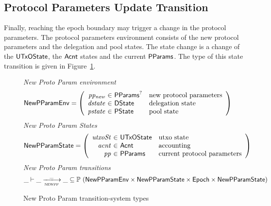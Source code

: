 \clearpage

\subsection{Protocol Parameters Update Transition}
\label{sec:pparam-update}

Finally, reaching the epoch boundary may trigger a change in the protocol
parameters. The protocol parameters environment consists of the new
protocol parameters and the delegation and pool states.
The state change is a change of the $\mathsf{UTxOState}$, the $\mathsf{Acnt}$ states and the current $\mathsf{PParams}$.
The type of this state transition is given in Figure~\ref{fig:ts-types:new-proto-param}.

\begin{figure}[htb]
  \emph{New Proto Param environment}
  \begin{equation*}
    \NewPParamEnv =
    \left(
      \begin{array}{r@{~\in~}ll}
        \var{pp_{new}} & \PParams^? & \text{new protocol parameters}\\
        \var{dstate} & \DState & \text{delegation state}\\
        \var{pstate} & \PState & \text{pool state}\\
      \end{array}
    \right)
  \end{equation*}
  \emph{New Proto Param States}
  \begin{equation*}
    \NewPParamState =
    \left(
      \begin{array}{r@{~\in~}ll}
        \var{utxoSt} & \UTxOState & \text{utxo state}\\
        \var{acnt} & \Acnt & \text{accounting}\\
        \var{pp} & \PParams & \text{current protocol parameters}\\
      \end{array}
    \right)
  \end{equation*}
  \emph{New Proto Param transitions}
  \begin{equation*}
    \_ \vdash
    \var{\_} \trans{newpp}{\_} \var{\_}
    \subseteq \powerset (\NewPParamEnv \times \NewPParamState \times \Epoch \times \NewPParamState)
  \end{equation*}
  \caption{New Proto Param transition-system types}
  \label{fig:ts-types:new-proto-param}
\end{figure}


